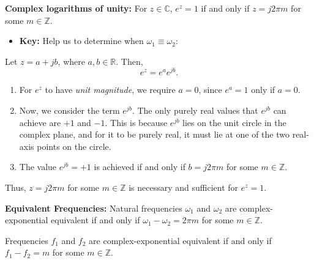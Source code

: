     \begin{theorem}
    \textbf{Complex logarithms of unity:} For \(z \in \mathbb{C}\), \(e^z = 1\) if and only if \(z = j 2\pi m\) for some \(m \in \mathbb{Z}\).
    \begin{itemize}
        \item \textbf{Key:} Help us to determine when \(\omega_1 \equiv \omega_2\):
    \end{itemize}
    \end{theorem}
    
    \begin{derivation}
        Let \( z = a + j b \), where \( a, b \in \mathbb{R} \). Then,
        \[
        e^z = e^a e^{j b}.
        \]
        
        \begin{enumerate}
            \item For \(e^z\) to have \textit{unit magnitude}, we require \( a = 0 \), since \( e^a = 1 \) only if \( a = 0 \).
            
            \item Now, we consider the term \( e^{j b} \). The only purely real values that \( e^{j b} \) can achieve are \( +1 \) and \( -1 \). This is because \( e^{j b} \) lies on the unit circle in the complex plane, and for it to be purely real, it must lie at one of the two real-axis points on the circle.
            
            \item The value \( e^{j b} = +1 \) is achieved if and only if \( b = j 2\pi m \) for some \( m \in \mathbb{Z} \).
        \end{enumerate}
        
        Thus, \( z = j 2\pi m \) for some \( m \in \mathbb{Z} \) is necessary and sufficient for \( e^z = 1 \).
    \end{derivation}
        

    \begin{theorem}
        \textbf{Equivalent Frequencies:} Natural frequencies \(\omega_1\) and \(\omega_2\) are complex-exponential equivalent if and only if \(\omega_1 - \omega_2 = 2\pi m\) for some \(m \in \mathbb{Z}\).
        \vspace{1em}

        Frequencies \(f_1\) and \(f_2\) are complex-exponential equivalent if and only if \(f_1 - f_2 = m\) for some \(m \in \mathbb{Z}\).
    \end{theorem}
        

